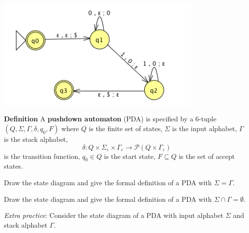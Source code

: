 \documentclass[12pt, oneside]{article}
\begin{document}
\includegraphics[width=4in]{../../resources/machines/Lect9PDA.png}


\newpage
{\bf Definition} A {\bf pushdown automaton} (PDA) is  specified by a  $6$-tuple $(Q, \Sigma, \Gamma, \delta, q_0, F)$
where $Q$ is the finite set of states, $\Sigma$ is the input alphabet,  $\Gamma$ is the stack alphabet,
\[
    \delta: Q \times \Sigma_\varepsilon  \times  \Gamma_\varepsilon \to \mathcal{P}( Q \times \Gamma_\varepsilon)
\]
is the transition function,  $q_0 \in Q$ is the start state, $F \subseteq  Q$ is the set of accept states.
    

\vspace{90pt}
Draw the state diagram and give the formal definition of a PDA with $\Sigma = \Gamma$.

\vfill

Draw the state diagram and give the formal definition of a PDA with $\Sigma \cap \Gamma = \emptyset$.
    
\vfill

    
\newpage
{\it Extra practice}: Consider the state diagram of a PDA with input alphabet 
$\Sigma$ and stack alphabet $\Gamma$.
\end{document}

